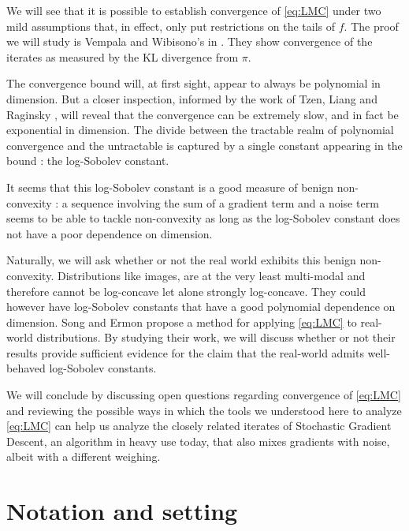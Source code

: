 \documentclass[11pt,twoside]{article}
\theoremstyle{definition}
\begin{document}
We will see that it is possible to establish convergence of \eqref{eq:LMC} under two mild assumptions that, in effect, only put restrictions on the tails of $f$. The proof we will study is Vempala and Wibisono's in \cite{vempala_rapid_2019}. They show convergence of the iterates as measured by the KL divergence from $\pi$.

The convergence bound will, at first sight, appear to always be polynomial in dimension. But a closer inspection, informed by the work of Tzen, Liang and Raginsky \cite{tzen_local_2018}, will reveal that the convergence can be extremely slow, and in fact be exponential in dimension. The divide between the tractable realm of polynomial convergence and the untractable is captured by a single constant appearing in the bound : the log-Sobolev constant. 

It seems that this log-Sobolev constant is a good measure of benign non-convexity : a sequence involving the sum of a gradient term and a noise term seems to be able to tackle non-convexity as long as the log-Sobolev constant does not have a poor dependence on dimension.

Naturally, we will ask whether or not the real world exhibits this benign non-convexity. Distributions like images, are at the very least multi-modal and therefore cannot be log-concave let alone strongly log-concave. They could however have log-Sobolev constants that have a good polynomial dependence on dimension. Song and Ermon propose a method for applying \eqref{eq:LMC} to real-world distributions. By studying their work, we will discuss whether or not  their results provide sufficient evidence for the claim that the real-world admits well-behaved log-Sobolev constants.

We will conclude by discussing open questions regarding convergence of \eqref{eq:LMC} and reviewing the possible ways in which the tools we understood here to analyze \eqref{eq:LMC} can help us analyze the closely related iterates of Stochastic Gradient Descent, an algorithm in heavy use today, that also mixes gradients with noise, albeit with a different weighing.

\section{Notation and setting}
\end{document}
